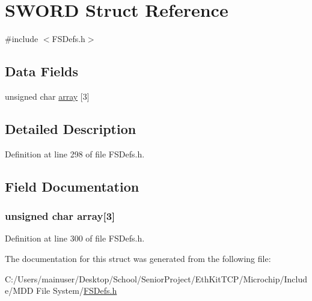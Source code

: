 \hypertarget{struct_s_w_o_r_d}{}\section{S\+W\+O\+R\+D Struct Reference}
\label{struct_s_w_o_r_d}


{\ttfamily \#include $<$F\+S\+Defs.\+h$>$}

\subsection*{Data Fields}
\begin{DoxyCompactItemize}
\item 
unsigned char \hyperlink{struct_s_w_o_r_d_ae49b6ce87ecf70bfef7af40298ef0a9c}{array} \mbox{[}3\mbox{]}
\end{DoxyCompactItemize}


\subsection{Detailed Description}


Definition at line 298 of file F\+S\+Defs.\+h.



\subsection{Field Documentation}
\hypertarget{struct_s_w_o_r_d_ae49b6ce87ecf70bfef7af40298ef0a9c}{}
\subsubsection[{array}]{\setlength{\rightskip}{0pt plus 5cm}unsigned char array\mbox{[}3\mbox{]}}\label{struct_s_w_o_r_d_ae49b6ce87ecf70bfef7af40298ef0a9c}


Definition at line 300 of file F\+S\+Defs.\+h.



The documentation for this struct was generated from the following file\+:\begin{DoxyCompactItemize}
\item 
C\+:/\+Users/mainuser/\+Desktop/\+School/\+Senior\+Project/\+Eth\+Kit\+T\+C\+P/\+Microchip/\+Include/\+M\+D\+D File System/\hyperlink{_f_s_defs_8h}{F\+S\+Defs.\+h}\end{DoxyCompactItemize}
